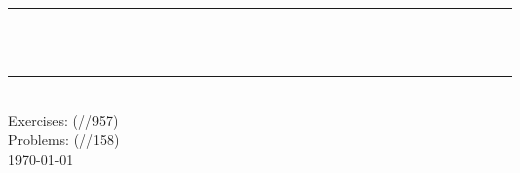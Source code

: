 \begin{titlepage}

    \newcommand{\HRule}{\rule{\linewidth}{0.5mm}}


    \center %
     



    \HRule \\[0.4cm]
    { \Huge \bfseries{}}\\ %
    \HRule \\[5cm]
     
            {\large Exercises: (\textcolor{myblue}{}/\textcolor{red}{}/957) \\ 
              Problems: (\textcolor{myblue}{}/\textcolor{red}{}/158)
            }\\[3cm]




    {\Large \today}\\[1cm] %


    \vfill


\end{titlepage}
